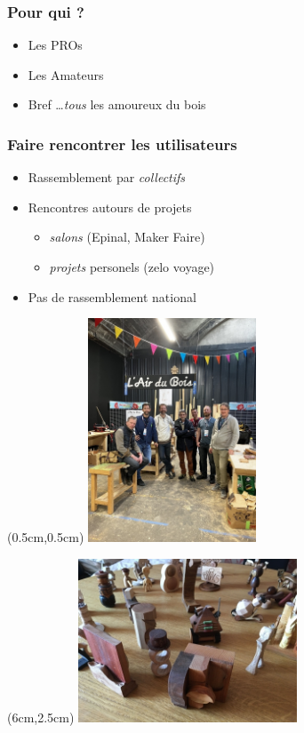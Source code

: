 \begin{frame}
  \frametitle{Pour qui ?}

  \begin{itemize}
    \item Les PROs
    \item Les Amateurs
    \item Bref \dots \emph{tous} les amoureux du bois
  \end{itemize}
\end{frame}

\begin{frame}
  \frametitle{Faire rencontrer les utilisateurs}

  \begin{itemize}
    \item Rassemblement par \emph{collectifs}
    \item Rencontres autours de projets
    {\small\begin{itemize}
      \item \emph{salons} (Epinal, Maker Faire)
      \item \emph{projets} personels (zelo voyage)
    \end{itemize}}
    \item Pas de rassemblement national
  \end{itemize}
\end{frame}


\begin{frame}
  \begin{textblock*}{8cm}(0.5cm,0.5cm)
    \includegraphics[width=5cm]{img/maker-lille-2022.jpg}
    \end{textblock*}
  \begin{textblock*}{8cm}(6cm,2.5cm)
    \includegraphics[width=6.5cm]{img/projet-8-ans.jpg}
    \end{textblock*}

\end{frame}


